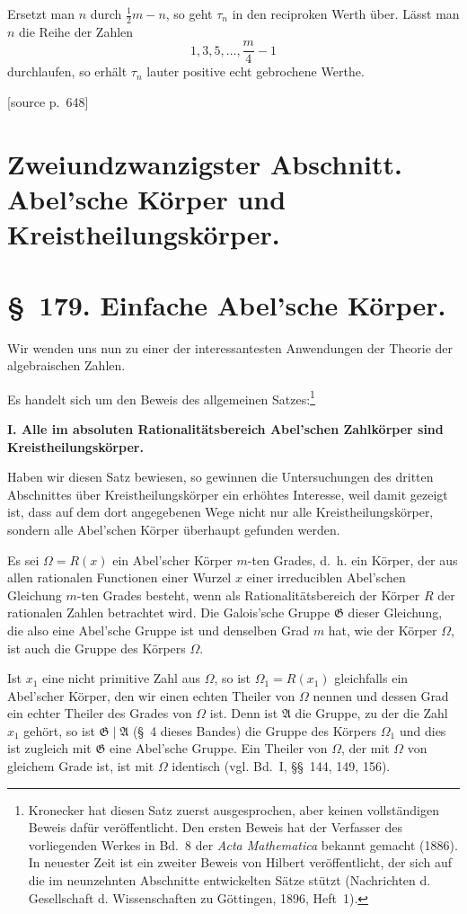 \documentclass[11pt]{article}
\newcommand{\Om}{\Omega}
\newcommand{\Gg}{\mathfrak G}
\newcommand{\Aa}{\mathfrak A}
\newcommand{\srcpage}[1]{\par\medskip\noindent\textsf{[source p.~#1]}\par\smallskip}
\begin{document}
Ersetzt man $n$ durch $\frac12m-n$, so geht $\tau_n$ in den reciproken Werth über. Lässt man $n$ die Reihe der Zahlen
\[
1,3,5,\ldots,\frac m4-1
\]
durchlaufen, so erhält $\tau_n$ lauter positive echt gebrochene Werthe.

\clearpage

\srcpage{648}
\section*{Zweiundzwanzigster Abschnitt. Abel'sche Körper und Kreistheilungskörper.}

\section*{\S~179. Einfache Abel'sche Körper.}

Wir wenden uns nun zu einer der interessantesten Anwendungen der Theorie der algebraischen Zahlen.

Es handelt sich um den Beweis des allgemeinen Satzes:\footnote{Kronecker hat diesen Satz zuerst ausgesprochen, aber keinen vollständigen Beweis dafür veröffentlicht. Den ersten Beweis hat der Verfasser des vorliegenden Werkes in Bd.~8 der \textit{Acta Mathematica} bekannt gemacht (1886). In neuester Zeit ist ein zweiter Beweis von Hilbert veröffentlicht, der sich auf die im neunzehnten Abschnitte entwickelten Sätze stützt (Nachrichten d. Gesellschaft d. Wissenschaften zu Göttingen, 1896, Heft~1).}

\textbf{I. Alle im absoluten Rationalitätsbereich Abel'schen Zahlkörper sind Kreistheilungskörper.}

Haben wir diesen Satz bewiesen, so gewinnen die Untersuchungen des dritten Abschnittes über Kreistheilungskörper ein erhöhtes Interesse, weil damit gezeigt ist, dass auf dem dort angegebenen Wege nicht nur alle Kreistheilungskörper, sondern alle Abel'schen Körper überhaupt gefunden werden.

Es sei $\Om=R(x)$ ein Abel'scher Körper $m$-ten Grades, d.~h. ein Körper, der aus allen rationalen Functionen einer Wurzel $x$ einer irreduciblen Abel'schen Gleichung $m$-ten Grades besteht, wenn als Rationalitätsbereich der Körper $R$ der rationalen Zahlen betrachtet wird. Die Galois'sche Gruppe $\Gg$ dieser Gleichung, die also eine Abel'sche Gruppe ist und denselben Grad $m$ hat, wie der Körper $\Om$, ist auch die Gruppe des Körpers $\Om$.

Ist $x_1$ eine nicht primitive Zahl aus $\Om$, so ist $\Om_1=R(x_1)$ gleichfalls ein Abel'scher Körper, den wir einen echten Theiler von $\Om$ nennen und dessen Grad ein echter Theiler des Grades von $\Om$ ist. Denn ist $\Aa$ die Gruppe, zu der die Zahl $x_1$ gehört, so ist $\Gg\mid\Aa$ (\S~4 dieses Bandes) die Gruppe des Körpers $\Om_1$ und dies ist zugleich mit $\Gg$ eine Abel'sche Gruppe. Ein Theiler von $\Om$, der mit $\Om$ von gleichem Grade ist, ist mit $\Om$ identisch (vgl. Bd.~I, \S\S~144, 149, 156).
\end{document}
